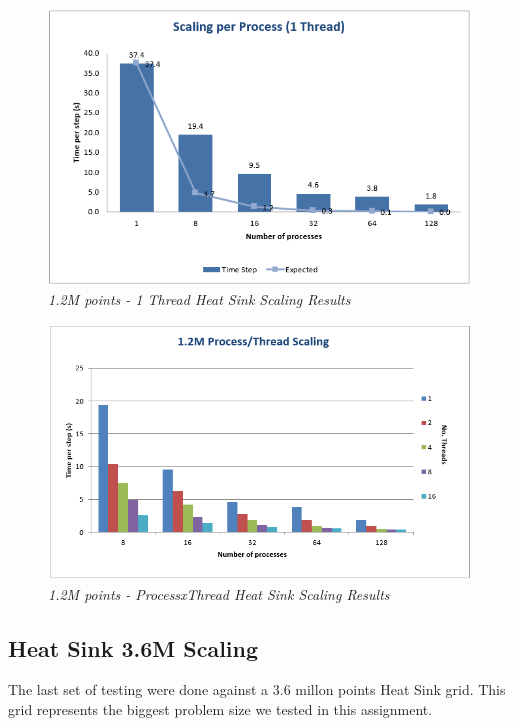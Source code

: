 \documentclass[12pt]{article}
\begin{document}
\begin{figure}[h!]
    \includegraphics[scale=0.9]{scaling12M_1.png}
    \centering
    \caption{\textit{1.2M points - 1 Thread Heat Sink Scaling Results}}
    \label{fig:12MScaling_1}
\end{figure}

\begin{figure}[h!]
    \includegraphics[scale=0.8]{scaling12M_2.png}
    \centering
    \caption{\textit{1.2M points - ProcessxThread Heat Sink Scaling Results}}
    \label{fig:12MScaling_2}
\end{figure}

\subsection{Heat Sink 3.6M Scaling}
The last set of testing were done against a 3.6 millon points Heat Sink grid. This grid represents the biggest problem size we tested in this assignment.
\end{document}
